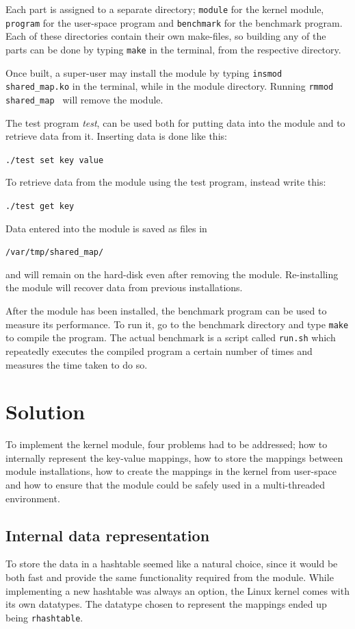 \documentclass[final,a4paper]{article}
\begin{document}
Each part is assigned to a separate directory; \texttt{module} for the kernel
module, \texttt{program} for the user-space program and \texttt{benchmark}
for the benchmark program. Each of these directories contain their own
make-files, so building any of the parts can be done by typing
\texttt{make} in the terminal, from the respective directory.

Once built, a super-user may install the module by typing 
{\tt insmod shared\_map.ko} in the terminal, while in the module directory.
Running {\tt rmmod shared\_map } will remove the module.

The test program \emph{test}, can be used both for putting data
into the module and to retrieve data from it. Inserting data is done like this:
\begin{center}
{\tt ./test set key value}
\end{center}
To retrieve data from the module using the test program, instead write this:
\begin{center}
{\tt ./test get key}
\end{center}

Data entered into the module is saved as files in
\begin{center}
{\texttt{/var/tmp/shared\_map/}}
\end{center}
and will remain on the hard-disk even after removing the module. Re-installing
the module will recover data from previous installations.

After the module has been installed, the benchmark program can be used to
measure its performance. To run it, go to the benchmark directory and type
\texttt{make} to compile the program. The actual benchmark is a script
called \texttt{run.sh} which repeatedly executes the compiled program a certain
number of times and measures the time taken to do so.

\section{Solution}
To implement the kernel module, four problems had to be addressed;
how to internally represent the key-value mappings, how to store the mappings
between module installations, how to create the mappings in the kernel from
user-space and how to ensure that the module could be safely used in a
multi-threaded environment.

\subsection{Internal data representation}
To store the data in a hashtable seemed like a natural choice, since it would
be both fast and provide the same functionality required from the module. While
implementing a new hashtable was always an option, the Linux kernel comes with
its own datatypes. The datatype chosen to represent the mappings ended up being
\texttt{rhashtable}.
\end{document}
